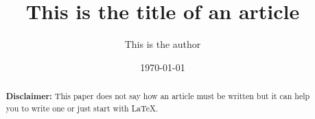 \documentclass{article}         %
\title{This is the title of an article}
\author{This is the author}
\date{\today}
\begin{document}

\maketitle

\begin{abstract}
    \textbf{Disclaimer: }This paper does not say how an article must be written but it can help you to write one or just start with \LaTeX.
\end{abstract}


\clearpage





\printglossaries{}

\printbibliography{}
\clearpage
\end{document}
